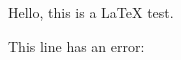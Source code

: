 \documentclass{article}
\begin{document}
Hello, this is a \LaTeX{} test.

This line has an error: \badcommand
\end{document}
